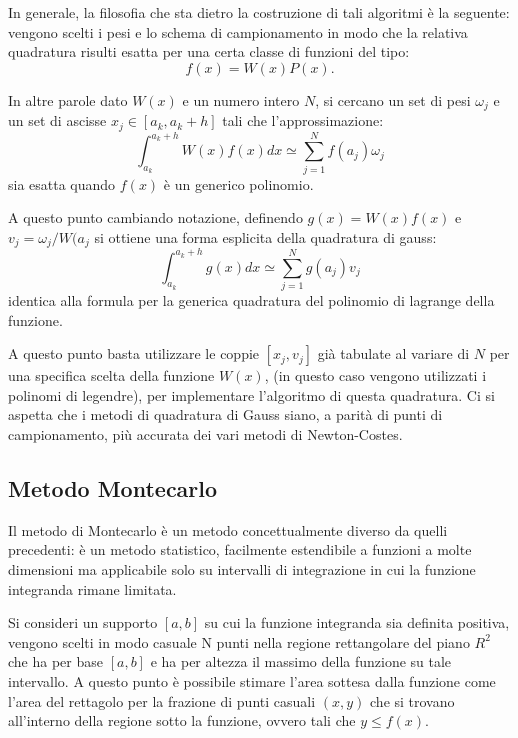 \documentclass{article}
\begin{document}
In generale, la filosofia che sta dietro la costruzione di tali algoritmi è la seguente: vengono scelti i pesi e lo schema di campionamento in modo che la relativa quadratura risulti esatta per una certa classe di funzioni del tipo:
$$f(x)=W(x)P(x) .$$

In altre parole dato $W(x)$ e un numero intero $N$, si cercano un set di pesi $\omega_{j}$ e un set di ascisse $x_{j} \in [a_{k},a_{k}+h]$ tali che l'approssimazione:
	\begin{equation}
	\int_{a_{k}}^{a_{k}+h}W(x)f(x)dx\simeq \sum_{j=1}^{N}f(a_{j})\omega_{j}
	\end{equation}
sia esatta quando $f(x)$ è un generico polinomio.

A questo punto cambiando notazione, definendo $g(x)=W(x)f(x)$ e $v_{j}=\omega_{j}/W(a_{j}$ si ottiene una forma esplicita della quadratura di gauss:
	\begin{equation}
	\int_{a_{k}}^{a_{k}+h}g(x)dx \simeq \sum_{j=1}^{N}g(a_{j})v_{j}
	\end{equation}
identica alla formula per la generica quadratura del polinomio di lagrange della funzione.

A questo punto basta utilizzare le coppie $[x_{j},v_{j}]$ già tabulate al variare di $N$ per una specifica scelta della funzione $W(x)$, (in questo caso vengono utilizzati i polinomi di legendre), per implementare l'algoritmo di questa quadratura.
Ci si aspetta che i metodi di quadratura di Gauss siano, a parità di punti di campionamento, più accurata dei vari metodi di Newton-Costes.

\subsection{Metodo Montecarlo}

Il metodo di Montecarlo è un metodo concettualmente diverso da quelli precedenti: è un metodo statistico, facilmente estendibile a funzioni a molte dimensioni ma applicabile solo su intervalli di integrazione in cui la funzione integranda rimane limitata.

Si consideri un supporto $[a,b]$ su cui la funzione integranda sia definita positiva, vengono scelti in modo casuale N punti nella regione rettangolare del piano $R^{2}$ che ha per base $[a,b]$ e ha per altezza il massimo della funzione su tale intervallo.
A questo punto è possibile stimare l'area sottesa dalla funzione come l'area del rettagolo per la frazione di punti casuali $(x,y)$ che si trovano all'interno della regione sotto la funzione, ovvero tali che $y \leq f(x)$.
\end{document}
